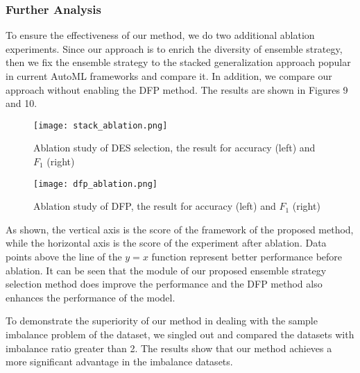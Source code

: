 \documentclass[review]{elsarticle}
\begin{document}
\subsubsection{Further Analysis}
To ensure the effectiveness of our method, we do two additional ablation experiments. Since our approach is to enrich the diversity of ensemble strategy, then we fix the ensemble strategy to the stacked generalization approach popular in current AutoML frameworks and compare it. In addition, we compare our approach without enabling the DFP method. The results are shown in Figures 9 and 10.
\begin{figure}[htbp]
	\centering
	\texttt{[image: stack\_ablation.png]}
	\caption{Ablation study of DES selection, the result for accuracy (left) and $F_1$ (right)}
\end{figure}
\begin{figure}[htbp]
	\centering
	\texttt{[image: dfp\_ablation.png]}
	\caption{Ablation study of DFP, the result for accuracy (left) and $F_1$ (right)}
\end{figure}
As shown, the vertical axis is the score of the framework of the proposed method, while the horizontal axis is the score of the experiment after ablation. Data points above the line of the $y=x$ function represent better performance before ablation. It can be seen that the module of our proposed ensemble strategy selection method does improve the performance and the DFP method also enhances the performance of the model.

To demonstrate the superiority of our method in dealing with the sample imbalance problem of the dataset, we singled out and compared the datasets with imbalance ratio greater than 2. The results show that our method achieves a more significant advantage in the imbalance datasets.
\end{document}
